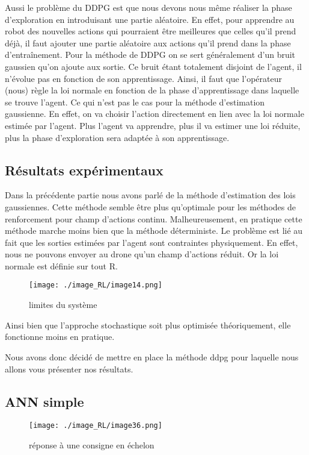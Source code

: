 Aussi le problème du DDPG est que nous devons nous même réaliser la phase d’exploration en introduisant une partie aléatoire.
En effet, pour apprendre au robot des nouvelles actions qui pourraient être meilleures que celles qu’il prend déjà, il faut ajouter une partie aléatoire aux actions qu’il prend dans la phase d’entraînement.
Pour la méthode de DDPG on se sert généralement d’un bruit gaussien qu’on ajoute aux sortie. Ce bruit étant totalement disjoint de l’agent, il n’évolue pas en fonction de son apprentissage. Ainsi, il faut que l’opérateur (nous) règle la loi normale en fonction de la phase d’apprentissage dans laquelle se trouve l’agent.
Ce qui n’est pas le cas pour la méthode d’estimation gaussienne.
En effet, on va choisir l’action directement en lien avec la loi normale estimée par l’agent.
Plus l’agent va apprendre, plus il va estimer une loi réduite, plus la phase d’exploration sera adaptée à son apprentissage.

\subsection{Résultats expérimentaux}
Dans la précédente partie nous avons parlé de la méthode d’estimation des lois gaussiennes. Cette méthode semble être plus qu’optimale pour les méthodes de renforcement pour champ d’actions continu.
Malheureusement, en pratique cette méthode marche moins bien que la méthode déterministe.
Le problème est lié au fait que les sorties estimées par l’agent sont contraintes physiquement. En effet, nous ne pouvons envoyer au drone qu’un champ d’actions réduit. Or la loi normale est définie sur tout R.

\begin{figure}[H]
    \centering
    \texttt{[image: ./image\_RL/image14.png]}
    \caption{  limites du système   }
\end{figure}

Ainsi bien que l’approche stochastique soit plus optimisée théoriquement, elle fonctionne moins en pratique.

Nous avons donc décidé de mettre en place la méthode ddpg pour laquelle nous allons vous présenter nos résultats.

\subsection{ANN simple}

\begin{figure}[H]
    \centering
    \texttt{[image: ./image\_RL/image36.png]}
    \caption{  réponse à une consigne en échelon   }
\end{figure}

